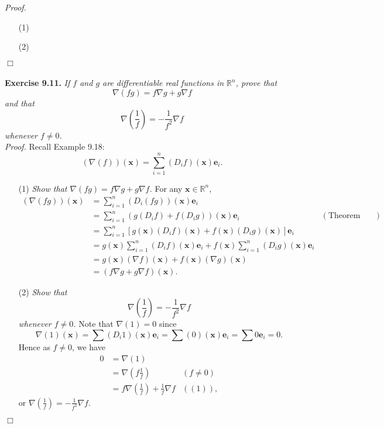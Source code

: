 \documentclass{article}
\begin{document}
\emph{Proof.}
\begin{enumerate}
\item[(1)]
\item[(2)]

\end{enumerate}
$\Box$ \\\\






\textbf{Exercise 9.11.}
\emph{If $f$ and $g$ are differentiable real functions in $\mathbb{R}^n$,
prove that
\[
  \nabla(fg) = f \nabla g + g \nabla f
\]
and that
\[
  \nabla\left(\frac{1}{f}\right) = -\frac{1}{f^2} \nabla f
\]
whenever $f \neq 0$.} \\

\emph{Proof.}
Recall Example 9.18:
\[
  (\nabla(f))(\mathbf{x}) = \sum_{i=1}^{n}(D_i f)(\mathbf{x})\mathbf{e}_i.
\]

\begin{enumerate}
\item[(1)]
  \emph{Show that $\nabla(fg) = f \nabla g + g \nabla f$.}
  For any $\mathbf{x} \in \mathbb{R}^n$,
  \begin{align*}
    (\nabla(fg))(\mathbf{x})
    &= \sum_{i=1}^{n}(D_i(fg))(\mathbf{x})\mathbf{e}_i \\
    &= \sum_{i=1}^{n}(g (D_i f) + f (D_i g))(\mathbf{x})\mathbf{e}_i
      &(\text{Theorem 5.3(b)}) \\
    &= \sum_{i=1}^{n} \left[ g(\mathbf{x}) (D_i f)(\mathbf{x})
      + f(\mathbf{x}) (D_i g)(\mathbf{x}) \right]\mathbf{e}_i \\
    &= g(\mathbf{x}) \sum_{i=1}^{n} (D_i f)(\mathbf{x})\mathbf{e}_i
      + f(\mathbf{x}) \sum_{i=1}^{n} (D_i g)(\mathbf{x})\mathbf{e}_i \\
    &= g(\mathbf{x}) (\nabla f)(\mathbf{x})
      + f(\mathbf{x}) (\nabla g)(\mathbf{x}) \\
    &= (f \nabla g + g \nabla f)(\mathbf{x}).
  \end{align*}

\item[(2)]
  \emph{Show that $$\nabla\left(\frac{1}{f}\right) = -\frac{1}{f^2} \nabla f$$
  whenever $f \neq 0$.}
  Note that $\nabla(1) = 0$
  since
  \[
    \nabla(1)(\mathbf{x})
    = \sum (D_i 1)(\mathbf{x})\mathbf{e}_i
    = \sum (0)(\mathbf{x})\mathbf{e}_i
    = \sum 0 \mathbf{e}_i
    = 0.
  \]
  Hence as $f \neq 0$, we have
  \begin{align*}
    0
    &= \nabla(1) \\
    &= \nabla\left(f \frac{1}{f}\right)
      & (f \neq 0) \\
    &= f \nabla\left(\frac{1}{f}\right) + \frac{1}{f} \nabla f
      & ((1)),
  \end{align*}
  or $\nabla\left(\frac{1}{f}\right) = -\frac{1}{f^2} \nabla f$.
\end{enumerate}
$\Box$ \\\\
\end{document}
